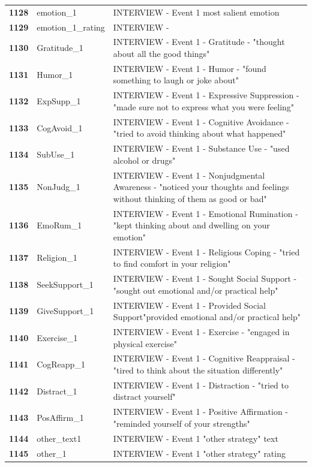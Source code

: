 \documentclass[
  letterpaper,
  DIV=11,
  numbers=noendperiod]{scrartcl}
\begin{document}
\begin{longtable}[t]{>{}cll}
\textbf{1128} & emotion\_1 & INTERVIEW - Event 1 most salient emotion\\
\textbf{1129} & emotion\_1\_rating & INTERVIEW -\\
\textbf{1130} & Gratitude\_1 & INTERVIEW - Event 1 - Gratitude - "thought about all the good things"\\
\addlinespace
\textbf{1131} & Humor\_1 & INTERVIEW - Event 1 - Humor - "found something to laugh or joke about"\\
\textbf{1132} & ExpSupp\_1 & INTERVIEW - Event 1 - Expressive Suppression - "made sure not to express what you were feeling"\\
\textbf{1133} & CogAvoid\_1 & INTERVIEW - Event 1 - Cognitive Avoidance - "tried to avoid thinking about what happened"\\
\textbf{1134} & SubUse\_1 & INTERVIEW - Event 1 - Substance Use - "used alcohol or drugs"\\
\textbf{1135} & NonJudg\_1 & INTERVIEW - Event 1 - Nonjudgmental Awareness - "noticed your thoughts and feelings without thinking of them as good or bad"\\
\addlinespace
\textbf{1136} & EmoRum\_1 & INTERVIEW - Event 1 - Emotional Rumination - "kept thinking about and dwelling on your emotion"\\
\textbf{1137} & Religion\_1 & INTERVIEW - Event 1 - Religious Coping - "tried to find comfort in your religion"\\
\textbf{1138} & SeekSupport\_1 & INTERVIEW - Event 1 - Sought Social Support - "sought out emotional and/or practical help"\\
\textbf{1139} & GiveSupport\_1 & INTERVIEW - Event 1 - Provided Social Support"provided emotional and/or practical help"\\
\textbf{1140} & Exercise\_1 & INTERVIEW - Event 1 - Exercise - "engaged in physical exercise"\\
\addlinespace
\textbf{1141} & CogReapp\_1 & INTERVIEW - Event 1 - Cognitive Reappraisal - "tired to think about the situation differently"\\
\textbf{1142} & Distract\_1 & INTERVIEW - Event 1 - Distraction - "tried to distract yourself"\\
\textbf{1143} & PosAffirm\_1 & INTERVIEW - Event 1 - Positive Affirmation - "reminded yourself of your strengths"\\
\textbf{1144} & other\_text1 & INTERVIEW - Event 1 "other strategy" text\\
\textbf{1145} & other\_1 & INTERVIEW - Event 1 "other strategy" rating\\

\end{longtable}
\end{document}
